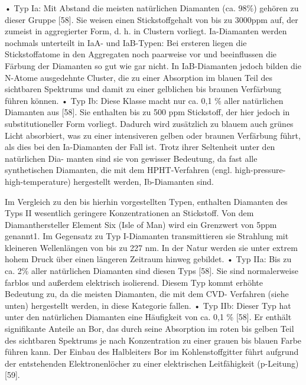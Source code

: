      • Typ Ia: Mit Abstand die meisten natürlichen Diamanten (ca. 98\%) gehören zu dieser Gruppe [58]. Sie weisen einen Stickstoffgehalt von bis zu 3000ppm auf, der zumeist in aggregierter Form, d. h. in Clustern vorliegt. Ia-Diamanten werden nochmals unterteilt in IaA- und IaB-Typen: Bei ersteren liegen die Stickstoffatome in den Aggregaten noch paarweise vor und beeinflussen die Färbung der Diamanten so gut wie gar nicht. In IaB-Diamanten jedoch bilden die N-Atome ausgedehnte Cluster, die zu einer Absorption im blauen Teil des sichtbaren Spektrums und damit zu einer gelblichen bis braunen Verfärbung führen können.
      • Typ Ib: Diese Klasse macht nur ca. 0,1 \% aller natürlichen Diamanten aus [58]. Sie enthalten bis zu 500 ppm Stickstoff, der hier jedoch in substitutioneller Form vorliegt. Dadurch wird zusätzlich zu blauem auch grünes Licht absorbiert, was zu einer intensiveren gelben oder braunen Verfärbung führt, als dies bei den Ia-Diamanten der Fall ist. Trotz ihrer Seltenheit unter den natürlichen Dia- manten sind sie von gewisser Bedeutung, da fast alle synthetischen Diamanten, die mit dem HPHT-Verfahren (engl. high-pressure-high-temperature) hergestellt werden, Ib-Diamanten sind.

      Im Vergleich zu den bis hierhin vorgestellten Typen, enthalten Diamanten des Typs II wesentlich geringere Konzentrationen an Stickstoff. Von dem Diamanthersteller Element Six (Isle of Man) wird ein Grenzwert von 5ppm genannt1. Im Gegensatz zu Typ I-Diamanten transmittieren sie Strahlung mit kleineren Wellenlängen von bis zu 227 nm. In der Natur werden sie unter extrem hohem Druck über einen längeren Zeitraum hinweg gebildet.
      • Typ IIa: Bis zu ca. 2\% aller natürlichen Diamanten sind diesen Typs [58]. Sie sind normalerweise farblos und außerdem elektrisch isolierend. Diesem Typ kommt erhöhte Bedeutung zu, da die meisten Diamanten, die mit dem CVD- Verfahren (siehe unten) hergestellt werden, in diese Kategorie fallen.
      • Typ IIb: Dieser Typ hat unter den natürlichen Diamanten eine Häufigkeit von ca. 0,1 \% [58]. Er enthält signifikante Anteile an Bor, das durch seine Absorption im roten bis gelben Teil des sichtbaren Spektrums je nach Konzentration zu einer grauen bis blauen Farbe führen kann. Der Einbau des Halbleiters Bor im Kohlenstoffgitter führt aufgrund der entstehenden Elektronenlöcher zu einer elektrischen Leitfähigkeit (p-Leitung) [59].

